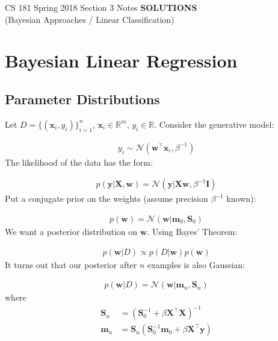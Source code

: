 \documentclass[12pt,letterpaper]{article}
\begin{document}
\begin{center}
    CS 181 Spring 2018 Section 3 Notes \textbf{SOLUTIONS}\\
(Bayesian Approaches / Linear Classification)
\end{center}



\section{Bayesian Linear Regression}

\subsection{Parameter Distributions}

Let $D = \{(\mathbf{x}_i, y_i)\}_{i=1}^n$, $\mathbf{x}_i \in \mathbb{R}^m$, $y_i \in \mathbb{R}$. Consider the generative model:

\begin{align}
y_i \sim \mathcal{N}(\mathbf{w}^\top \mathbf{x}_i, \beta^{-1})
\end{align}
\noindent The likelihood of the data has the form:

\begin{align}
    p(\mathbf{y}|\mathbf{X},\mathbf{w}) = \mathcal{N}(\mathbf{y}|\mathbf{X}\mathbf{w},\beta^{-1}\mathbf{I})
\end{align}
\noindent Put a conjugate prior on the weights (assume precision $\beta^{-1}$ known):

\begin{align}
    p(\mathbf{w}) = \mathcal{N}(\mathbf{w}|\mathbf{m}_0, \mathbf{S}_0)
\end{align}
\noindent We want a posterior distribution on $\mathbf{w}$. Using Bayes' Theorem:

\begin{align}
    p(\mathbf{w}|D) \propto p(D|\mathbf{w})p(\mathbf{w})
\end{align}
\noindent It turns out that our posterior after $n$ examples is also Gaussian:

\begin{align}
    p(\mathbf{w}|D) = \mathcal{N}(\mathbf{w}|\mathbf{m}_n, \mathbf{S}_n)
\end{align}
where
\begin{align}
    \mathbf{S}_n &= \left(\mathbf{S}_0^{-1} + \beta \mathbf{X}^\top\mathbf{X}\right)^{-1}\\
    \mathbf{m}_n &= \mathbf{S}_n(\mathbf{S}_0^{-1}\mathbf{m}_0 + \beta \mathbf{X}^\top\mathbf{y})
\end{align}
\end{document}

